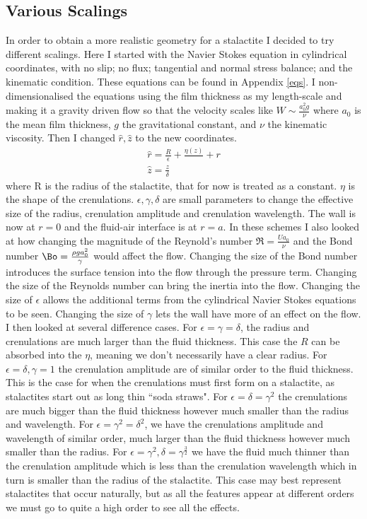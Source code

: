 \documentclass[12pt]{article}
\begin{document}
\subsection{Various Scalings}
In order to obtain a more realistic geometry for a stalactite I decided to try different scalings.
Here I started with the Navier Stokes equation in cylindrical coordinates, with no slip; no flux; tangential and normal stress balance; and the kinematic condition. These equations can be found in Appendix \ref{eqs}. I non-dimensionalised the equations using the film thickness as my length-scale and making it a gravity driven flow so that the velocity scales like $W\sim \frac{a_0^2 g}{\nu}$ where $a_0$ is the mean film thickness, $g$ the gravitational constant, and $\nu$ the kinematic viscosity. Then I changed $\hat{r}, \hat{z}$ to the new coordinates.
\begin{align}
\hat{r} = \frac{R}{\epsilon} + \frac{\eta(z)}{} + r \\
\hat{z} = \frac{z}{\delta}
\end{align}
where R is the radius of the stalactite, that for now is treated as a constant. $\eta$ is the shape of the crenulations. $\epsilon ,\gamma, \delta$ are small parameters to change the effective size of the radius, crenulation amplitude and crenulation wavelength. The wall is now at $r=0$ and the fluid-air interface is at $r = a$. In these schemes I also looked at how changing the magnitude of the Reynold's number $\Re = \frac{Ua_0}{\nu}$  and the Bond number $\Bo =\frac{\rho g a_0^2}{\gamma}$ would affect the flow. Changing the size of the Bond number introduces the surface tension into the flow through the pressure term. Changing the size of the Reynolds number can bring the inertia into the flow.
 Changing the size of $\epsilon$ allows the additional terms from the cylindrical Navier Stokes equations to be seen. Changing the size of $\gamma$ lets the wall have more of an effect on the flow. I then looked at several difference cases. For $\epsilon = \gamma = \delta$, the radius and crenulations are much larger than the fluid thickness. This case the $R$ can be absorbed into the $\eta$, meaning we don't necessarily have a clear radius. For  $\epsilon = \delta, \gamma = 1$ the crenulation amplitude are of similar order to the fluid thickness. This is the case for when the crenulations must first form on a stalactite, as stalactites start out as long thin ``soda straws".
 For $\epsilon =\delta = \gamma^2 $ the crenulations are much bigger than the fluid thickness however much smaller than the radius and wavelength. For $\epsilon = \gamma^2 = \delta^2$, we have the crenulations amplitude and wavelength of similar order, much larger than the fluid thickness however much smaller than the radius. For $\epsilon= \gamma^2, \delta = \gamma^{\frac{3}{2}}$  we have the fluid much thinner than the crenulation amplitude which is less than the crenulation wavelength which in turn is smaller than the radius of the stalactite. This case may best represent stalactites that occur naturally, but as all the features appear at different orders we must go to quite a high order to see all the effects. 
\end{document}
